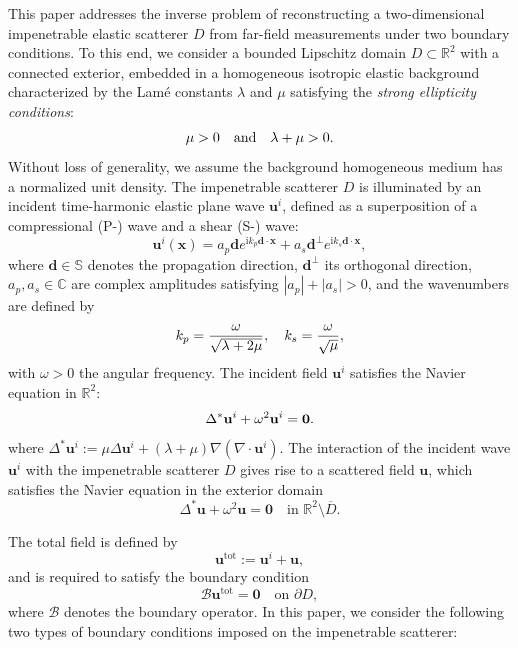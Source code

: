 \documentclass[11pt,reqno,twoside]{amsart}
\theoremstyle{definition}
\theoremstyle{remark}
\numberwithin{equation}{section}
\begin{document}
This paper addresses the inverse problem of reconstructing a two-dimensional impenetrable elastic scatterer $D$ from far-field measurements under two boundary conditions. To this end, we consider a bounded Lipschitz domain $D \subset \mathbb{R}^2$ with a connected exterior, embedded in a homogeneous isotropic elastic background characterized by the Lam\'{e} constants $\lambda$ and $\mu$ satisfying the \emph{strong ellipticity conditions}:
\begin{equation}\notag
	\mu > 0 \quad 	\text{and} \quad \lambda + \mu > 0.
\end{equation} 
Without loss of generality, we assume the background homogeneous  medium has a normalized unit density. The impenetrable scatterer $D$ is illuminated by an incident time-harmonic elastic plane wave $\mathbf{u}^i$, defined as a superposition of a compressional (P-) wave and a shear (S-) wave:
\begin{equation}\label{eq:ui}
	\mathbf{u}^i(\mathbf{x}) = a_p \mathbf{d} e^{\mathrm{i} k_p \mathbf{d} \cdot \mathbf{x}} + a_s \mathbf{d}^\perp e^{\mathrm{i} k_s \mathbf{d} \cdot \mathbf{x}},
\end{equation}
where $\mathbf{d}\in\mathbb{S}$ denotes the propagation direction, $\mathbf{d}^\perp$ its orthogonal direction, $a_p,a_s\in\mathbb{C}$ are complex amplitudes satisfying $|a_p|+|a_s|>0$, and the wavenumbers are defined by
\begin{equation}\notag
	k_p = \frac{\omega}{\sqrt{\lambda + 2\mu}}, \quad k_s = \frac{\omega}{\sqrt{\mu}},
\end{equation}
with $\omega>0$ the angular frequency. The incident field $\mathbf{u}^i$ satisfies the Navier equation in $\mathbb{R}^2$:
\begin{equation}\notag
	\Delta^*\mathbf{u}^i + \omega^2 \mathbf{u}^i = \mathbf{0}.
\end{equation}
where \(\Delta^*\mathbf{u}^i:= \mu \Delta \mathbf{u}^i + (\lambda + \mu) \nabla( \nabla \cdot \mathbf{u}^i)\). The interaction of the incident wave $\mathbf{u}^i$ with the impenetrable scatterer $D$ gives rise to a scattered field $\mathbf{u}$, which satisfies the Navier equation in the exterior domain
\begin{equation}\label{eq:syst1}
	\Delta^* \mathbf{u} + \omega^2 \mathbf{u} = \mathbf{0}
	\quad \text{in } \mathbb{R}^2 \setminus \overline{D}.
\end{equation}

The total field is defined by
$$
\mathbf{u}^{\mathrm{tot}} := \mathbf{u}^i + \mathbf{u},
$$
and is required to satisfy the boundary condition
\begin{equation}\label{eq:BC}
	\mathcal{B} \mathbf{u}^{\mathrm{tot}} = \mathbf{0}
	\quad \text{on } \partial D,
\end{equation}
where $\mathcal{B}$ denotes the boundary operator. In this paper, we consider the following two types of boundary conditions imposed on the impenetrable scatterer:
\end{document}
